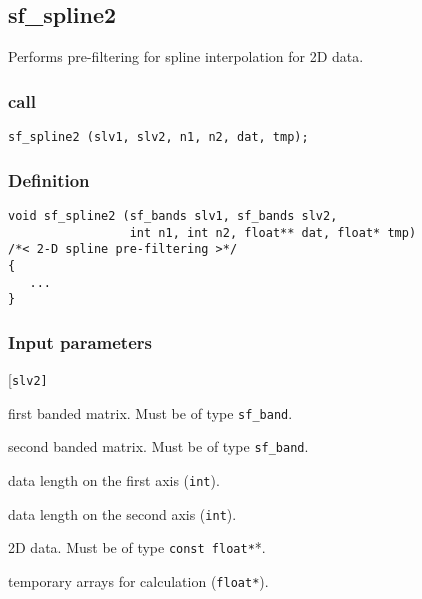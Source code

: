 \subsection{{sf\_spline2}}
Performs pre-filtering for spline interpolation for 2D data.

\subsubsection*{call}
\begin{verbatim}sf_spline2 (slv1, slv2, n1, n2, dat, tmp);\end{verbatim}

\subsubsection*{Definition}
\begin{verbatim}
void sf_spline2 (sf_bands slv1, sf_bands slv2, 
                 int n1, int n2, float** dat, float* tmp)
/*< 2-D spline pre-filtering >*/
{
   ...
}
\end{verbatim}

\subsubsection*{Input parameters}
\begin{desclist}{\tt }{\quad}[\tt slv2]
   \setlength\itemsep{0pt}
   \item[slv1] first banded matrix. Must be of type \texttt{sf\_band}. 
   \item[slv2] second banded matrix. Must be of type \texttt{sf\_band}. 
   \item[n1]   data length on the first axis (\texttt{int}).  
   \item[n2]	  data length on the second axis (\texttt{int}). 
   \item[dat]  2D data. Must be of type \texttt{const float*}*.
   \item[tmp]  temporary arrays for calculation (\texttt{float*}).
\end{desclist}





